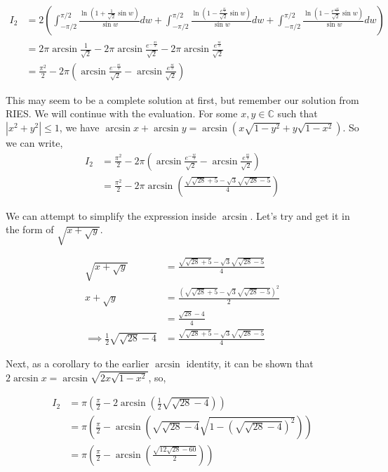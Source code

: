 \documentclass{article}
\begin{document}
\begin{align*}
    I_{2} &= 2\left( \int_{-\pi/2}^{\pi/2}{\frac{\ln\left( 1 + \frac{1}{\sqrt{2}}\sin{w} \right)}{\sin{w}}dw} + \int_{-\pi/2}^{\pi/2}{\frac{\ln\left( 1 - \frac{e^{\frac{\pi i}{3}}}{\sqrt{2}}\sin{w} \right)}{\sin{w}}dw} + \int_{-\pi/2}^{\pi/2}{\frac{\ln\left( 1 - \frac{e^{\frac{-\pi i}{3}}}{\sqrt{2}}\sin{w} \right)}{\sin{w}}dw} \right) \\
    &= 2\pi\arcsin{\frac{1}{\sqrt{2}}} - 2\pi\arcsin{\frac{e^{-\frac{\pi i}{3}}}{\sqrt{2}}} - 2\pi\arcsin{\frac{e^{\frac{\pi i}{3}}}{\sqrt{2}}} \\
    &= \frac{\pi^2}{2} -2\pi\left( \arcsin{\frac{e^{-\frac{\pi i}{3}}}{\sqrt{2}}} - \arcsin{\frac{e^{\frac{\pi i}{3}}}{\sqrt{2}}} \right)
\end{align*}

This may seem to be a complete solution at first, but remember our solution from RIES. We will continue with the evaluation. For some $x, y \in \mathbb{C}$ such that $|x^2 + y^2| \leq 1$, we have $\arcsin{x} + \arcsin{y} = \arcsin{\left( x\sqrt{1 - y^2} +y\sqrt{1 - x^2} \right)}$. So we can write,
\begin{align*}
    I_{2} &= \frac{\pi^2}{2} -2\pi\left( \arcsin{\frac{e^{-\frac{\pi i}{3}}}{\sqrt{2}}} - \arcsin{\frac{e^{\frac{\pi i}{3}}}{\sqrt{2}}} \right) \\
    &= \frac{\pi^2}{2} - 2\pi\arcsin\left( \frac{\sqrt{\sqrt{28} + 5}-\sqrt{3}\sqrt{\sqrt{28} - 5}}{4} \right)
\end{align*}

We can attempt to simplify the expression inside $\arcsin$. Let's try and get it in the form of $\sqrt{x + \sqrt{y}}$.

\begin{align*}
    \sqrt{x + \sqrt{y}} &= \frac{\sqrt{\sqrt{28} + 5}-\sqrt{3}\sqrt{\sqrt{28} - 5}}{4} \\
    x + \sqrt{y} &= \frac{\left(\sqrt{\sqrt{28} + 5}-\sqrt{3}\sqrt{\sqrt{28} - 5}\right)^2}{2} \\
    &= \frac{\sqrt{28} - 4}{4} \\ 
    \implies  \frac{1}{2}\sqrt{\sqrt{28}-4} &= \frac{\sqrt{\sqrt{28} + 5}-\sqrt{3}\sqrt{\sqrt{28} - 5}}{4}
\end{align*}

Next, as a corollary to the earlier $\arcsin$ identity, it can be shown that $2\arcsin{x} = \arcsin{\sqrt{2x\sqrt{1-x^2}}}$, so,

\begin{align*}
    I_{2} &= \pi \left( \frac{\pi}{2} - 2\arcsin\left( \frac{1}{2}\sqrt{\sqrt{28}-4} \right)\right) \\
    &= \pi \left( \frac{\pi}{2} - \arcsin\left(\sqrt{\sqrt{28}-4}\sqrt{1 - \left( \sqrt{\sqrt{28}-4}\right)^2}  \right) \right) \\ 
    &= \pi \left( \frac{\pi}{2} - \arcsin\left( \frac{\sqrt{12\sqrt{28} - 60}}{2} \right) \right)
\end{align*}
\end{document}
